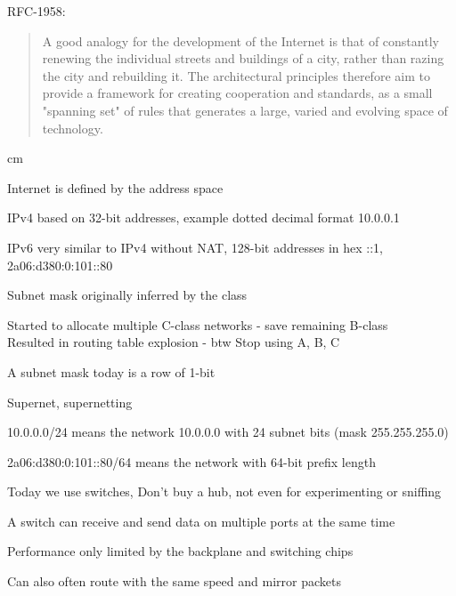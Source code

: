 \documentclass[Screen16to9,17pt]{foils}
\begin{document}
RFC-1958:
\begin{quote}
 A good analogy for the development of the Internet is that of
 constantly renewing the individual streets and buildings of a city,
 rather than razing the city and rebuilding it. The architectural
 principles therefore aim to provide a framework for creating
 cooperation and standards, as a small "spanning set" of rules that
 generates a large, varied and evolving space of technology.
\end{quote}




 cm

\begin{list2}
\item Internet is defined by the address space
\item IPv4 based on 32-bit addresses, example dotted decimal format 10.0.0.1
\item IPv6 very similar to IPv4 without NAT, 128-bit addresses in hex ::1, 2a06:d380:0:101::80
\end{list2}




\begin{list2}
\item Subnet mask originally inferred by the class
\item Started to allocate multiple C-class networks - save remaining B-class\\
Resulted in routing table explosion - btw Stop using A, B, C
\item A subnet mask today is a row of 1-bit
\item Supernet, supernetting
\item 10.0.0.0/24 means the network 10.0.0.0 with 24 subnet bits (mask 255.255.255.0)
\item 2a06:d380:0:101::80/64 means the network with 64-bit prefix length
\end{list2}






\begin{list1}
\item Today we use switches, Don't buy a hub, not even for experimenting or sniffing
\item A switch can receive and send data on multiple ports at the same time
\item Performance only limited by the backplane and switching chips
\item Can also often route with the same speed and mirror packets
\end{list1}
\end{document}

